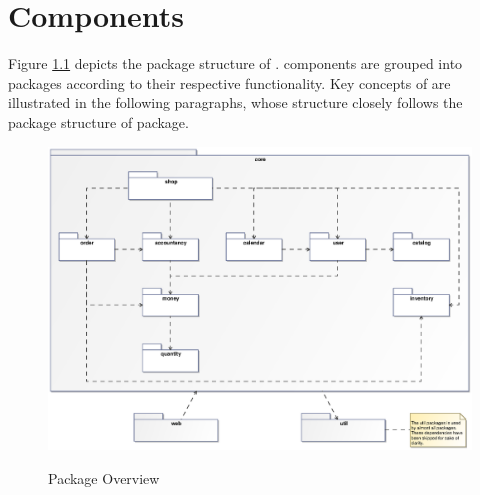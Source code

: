 \chapter{\salespoint{} Components}
\label{chap:components}
Figure \ref{package_overview} depicts the package structure of \salespoint{}.
\salespoint{} components are grouped into packages according to their respective functionality.
Key concepts of \salespoint{} are illustrated in the following paragraphs, whose structure closely follows the package structure of \salespoint{}  package.

\begin{figure}
	\centering
  \includegraphics[width=1.0\textwidth]{images/Package_Overview.eps}
	\label{package_overview}
	\caption{Package Overview}
\end{figure}












